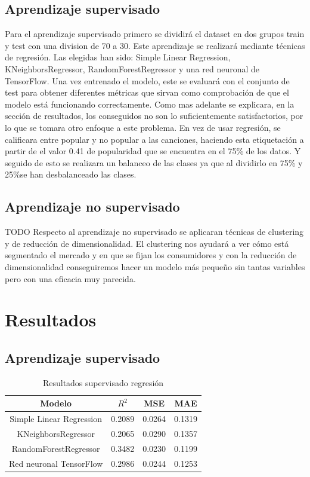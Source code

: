 \documentclass{wsdcr}
\begin{document}
\subsection{Aprendizaje supervisado}
Para el aprendizaje supervisado primero se dividirá el dataset en dos grupos train y test con una division de 70 a 30. Este aprendizaje se realizará mediante técnicas de regresión. Las elegidas han sido: Simple Linear Regression, KNeighborsRegressor, RandomForestRegressor y una red neuronal de TensorFlow. Una vez entrenado el modelo, este se evaluará con el conjunto de test para obtener diferentes métricas que sirvan como comprobación de que el modelo está funcionando correctamente.
Como mas adelante se explicara, en la sección de resultados, los conseguidos no son lo suficientemente satisfactorios, por lo que se tomara otro enfoque a este problema. En vez de usar regresión, se calificara entre popular y no popular a las canciones, haciendo esta etiquetación a partir de el valor 0.41 de popularidad que se encuentra en el 75\% de los datos. Y seguido de esto se realizara un balanceo de las clases ya que al dividirlo en 75\% y 25\%se han desbalanceado las clases.
\subsection{Aprendizaje no supervisado}
TODO
Respecto al aprendizaje no supervisado se aplicaran técnicas de clustering y de reducción de dimensionalidad. El clustering nos ayudará a ver cómo está segmentado el mercado y en que se fijan los consumidores y con la reducción de dimensionalidad conseguiremos hacer un modelo más pequeño sin tantas variables pero con una eficacia muy parecida.

\section{Resultados}
\subsection{Aprendizaje supervisado}
\begin{table}[t]
    \begin{center}
        \begin{tabular}{| c | c | c | c | }\hline
            Modelo                   & $R^{2}$ & MSE    & MAE    \\ \hline
            Simple Linear Regression & 0.2089  & 0.0264 & 0.1319 \\
            KNeighborsRegressor      & 0.2065  & 0.0290 & 0.1357 \\
            RandomForestRegressor    & 0.3482  & 0.0230 & 0.1199 \\
            Red neuronal TensorFlow  & 0.2986  & 0.0244 & 0.1253 \\ \hline
        \end{tabular}
        \caption{Resultados supervisado regresión}
        \label{tab:resultados supervisado regresion}
    \end{center}
\end{table}
\end{document}
